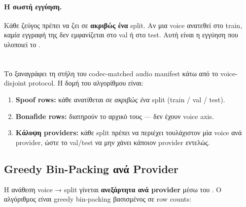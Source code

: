 \paragraph{Η σωστή εγγύηση.}
Κάθε ζεύγος 
πρέπει να ζει σε \textbf{ακριβώς ένα} split.
Αν μια voice ανατεθεί στο train, \emph{καμία} εγγραφή της δεν εμφανίζεται
στο val ή στο test.
Αυτή είναι η εγγύηση που υλοποιεί το .

\section{}
\label{sec:make-voice-disjoint}

Το 
ξαναγράφει τη στήλη  του codec-matched audio manifest
κάτω από το voice-disjoint protocol.
Η δομή του αλγορίθμου είναι:

\begin{english}
\begin{enumerate}
  \item \textbf{Spoof rows:} κάθε 
        ανατίθεται σε \emph{ακριβώς ένα} split
        (train / val / test).
  \item \textbf{Bonafide rows:} διατηρούν το αρχικό τους 
        — δεν έχουν voice axis.
  \item \textbf{Κάλυψη providers:} κάθε split πρέπει να περιέχει
        τουλάχιστον μία voice ανά provider,
        ώστε το val/test να μην χάνει κάποιον provider εντελώς.
\end{enumerate}
\end{english}

\subsection{Greedy Bin-Packing ανά Provider}
\label{subsec:greedy-binpacking}

Η ανάθεση voice → split γίνεται \textbf{ανεξάρτητα ανά provider}
μέσω του .
Ο αλγόριθμος είναι greedy bin-packing βασισμένος σε row counts:

